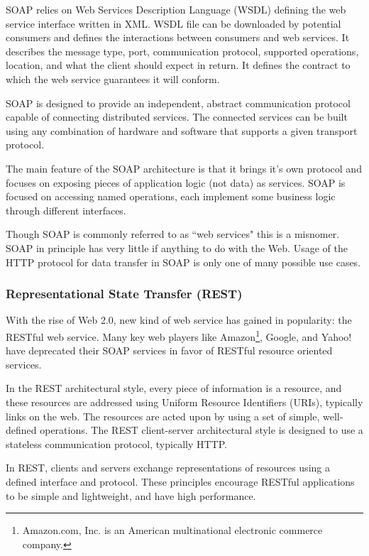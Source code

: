 \documentclass[thesis=M,english]{FITthesis}[2012/10/20]
\begin{document}
SOAP relies on Web Services Description Language (WSDL) defining the web service interface written in XML. WSDL file can be downloaded by potential consumers and defines the interactions between consumers and web services. It describes the message type, port, communication protocol, supported operations, location, and what the client should expect in return. It defines the contract to which the web service guarantees it will conform.

SOAP is designed to provide an independent, abstract communication protocol capable of connecting distributed services. The connected services can be built using any combination of hardware and software that supports a given transport protocol.\cite{java}

The main feature of the SOAP architecture is that it brings it’s own protocol and focuses on exposing pieces of application logic (not data) as services. SOAP is focused on accessing named operations, each implement some business logic through different interfaces.

Though SOAP is commonly referred to as ``web services" this is a misnomer. SOAP in principle has very little if anything to do with the Web.\cite{spf13} Usage of the HTTP protocol for data transfer in SOAP is only one of many possible use cases.


\subsubsection{Representational State Transfer (REST)}

With the rise of Web 2.0, new kind of web service has gained in popularity: the RESTful web service. Many key web players like Amazon\footnote{Amazon.com, Inc. is an American multinational electronic commerce company.}, Google, and Yahoo! have deprecated their SOAP services in favor of RESTful resource oriented services.\cite{java}

In the REST architectural style, every piece of information is a resource, and these resources are addressed using Uniform Resource Identifiers (URIs), typically links on the web. The resources are acted upon by using a set of simple, well-defined operations. The REST client-server architectural style is designed to use a stateless communication protocol, typically HTTP. 

In REST, clients and servers exchange representations of resources using a defined interface and protocol. These principles encourage RESTful applications to be simple and lightweight, and have high performance.
\end{document}
